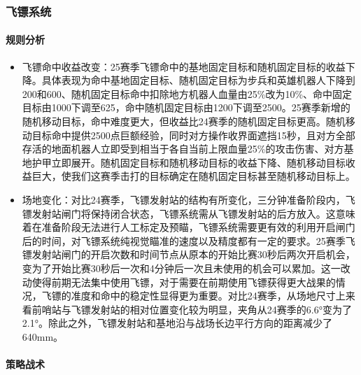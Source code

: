\subsubsection{飞镖系统}

    \paragraph{规则分析}


        \begin{itemize}
            \item 飞镖命中收益改变：25赛季飞镖命中的基地固定目标和随机固定目标的收益下降。具体表现为命中基地固定目标、随机固定目标为步兵和英雄机器人下降到200和600、随机固定目标命中扣除地方机器人血量由25\%改为10\%、命中固定目标由1000下调至625，命中随机固定目标由1200下调至2500。25赛季新增的随机移动目标，命中难度更大，但收益比24赛季的随机固定目标更高。随机移动目标命中提供2500点巨额经验，同时对方操作收界面遮挡15秒，且对方全部存活的地面机器人立即受到相当于各自当前上限血量25\%的攻击伤害、对方基地护甲立即展开。随机固定目标和随机移动目标的收益下降、随机移动目标收益巨大，使我们这赛季击打的目标确定在随机固定目标甚至随机移动目标上。
            \item 场地变化：对比24赛季，飞镖发射站的结构有所变化，三分钟准备阶段内，飞镖发射站闸门将保持闭合状态，飞镖系统需从飞镖发射站的后方放入。这意味着在准备阶段无法进行人工标定及预瞄，飞镖系统需要更有效的利用开启闸门后的时间，对飞镖系统纯视觉瞄准的速度以及精度都有一定的要求。25赛季飞镖发射站闸门的开启次数和时间节点从原本的开始比赛30秒后两次开启机会，变为了开始比赛30秒后一次和4分钟后一次且未使用的机会可以累加。这一改动使得前期无法集中使用飞镖，对于需要在前期使用飞镖获得更大战果的情况，飞镖的准度和命中的稳定性显得更为重要。对比24赛季，从场地尺寸上来看前哨站与飞镖发射站的相对位置变化较为明显，夹角从24赛季的6.6°变为了2.1°。除此之外，飞镖发射站和基地沿与战场长边平行方向的距离减少了640mm。
        \end{itemize}
    
    \paragraph{策略战术}


